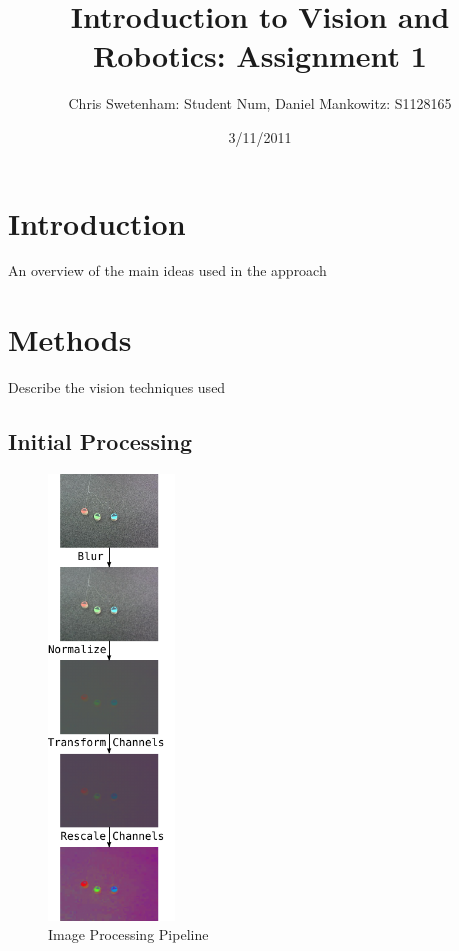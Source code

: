 \documentclass{article}
\title{Introduction to Vision and Robotics: Assignment 1}
\author{Chris Swetenham: Student Num, Daniel Mankowitz: S1128165}
\date{3/11/2011}
\begin{document}
\maketitle

\section{Introduction}
\label{sec:introduction}
An overview of the main ideas used in the approach


\section{Methods}
\label{sec:methods}
Describe the vision techniques used





\subsection{Initial Processing}
\label{sec:processing}

\begin{figure}[htbp!] 
  \centering
    \includegraphics[width=0.3\textwidth]{../Drawings/processing.pdf}
    \caption{Image Processing Pipeline}
    \label{fig:processing}
\end{figure}
\end{document}
